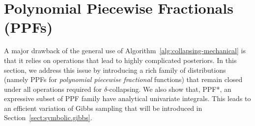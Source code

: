 \documentclass[]{article}
\begin{document}
\section{Polynomial Piecewise Fractionals 
(PPFs)}
\label{sect:ppfs}
A major drawback of the general use of 
Algorithm~\ref{alg:collapsing-mechanical}
is that it relies on operations that lead to highly complicated posteriors. 
In this section, we address this issue by introducing a rich family of distributions (namely PPFs for \emph{polynomial piecewise fractional} functions)
that remain closed under all operations required for $\delta$-collapsing. 
We also show that, PPF*, an expressive subset of PPF family have analytical univariate integrals.
This leads to an efficient variation of Gibbs sampling that will be introduced in Section~\ref{sect:symbolic.gibbs}.
\end{document}
